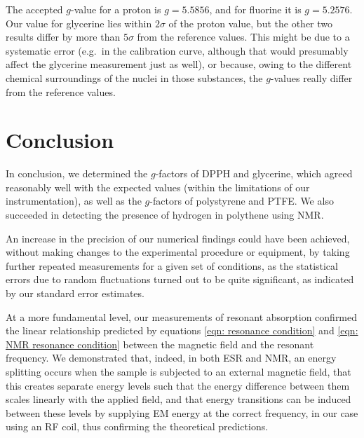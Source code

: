 \documentclass[a4paper]{jpconf}
\numberwithin{equation}{section}
\begin{document}
\vspace{10pt}

The accepted $g$-value for a proton is $g = 5.5856$, and for fluorine it is $g = 5.2576$. Our value for glycerine lies within $2\sigma$ of the proton value, but the other two results differ by more than $5\sigma$ from the reference values. This might be due to a systematic error (e.g.\ in the calibration curve, although that would presumably affect the glycerine measurement just as well), or because, owing to the different chemical surroundings of the nuclei in those substances, the $g$-values really differ from the reference values.

\section{Conclusion}

In conclusion, we determined the $g$-factors of DPPH and glycerine, which agreed reasonably well with the expected values (within the limitations of our instrumentation), as well as the $g$-factors of polystyrene and PTFE. We also succeeded in detecting the presence of hydrogen in polythene using NMR. 

An increase in the precision of our numerical findings could have been achieved, without making changes to the experimental procedure or equipment, by taking further repeated measurements for a given set of conditions, as the statistical errors due to random fluctuations turned out to be quite significant, as indicated by our standard error estimates. 

At a more fundamental level, our measurements of resonant absorption confirmed the linear relationship predicted by equations \eqref{eqn: resonance condition} and \eqref{eqn: NMR resonance condition} between the magnetic field and the resonant frequency. We demonstrated that, indeed, in both ESR and NMR, an energy splitting occurs when the sample is subjected to an external magnetic field, that this creates separate energy levels such that the energy difference between them scales linearly with the applied field, and that energy transitions can be induced between these levels by supplying EM energy at the correct frequency, in our case using an RF coil, thus confirming the theoretical predictions. 


\end{document}

